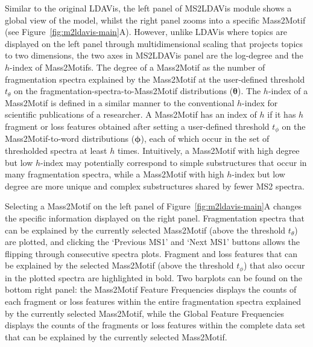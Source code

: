 Similar to the original LDAVis, the left panel of MS2LDAVis module shows a global view of the model, whilst the right panel zooms into a specific Mass2Motif (see Figure~\ref{fig:m2ldavis-main}A). However, unlike LDAVis where topics are displayed on the left panel through multidimensional scaling that projects topics to two dimensions, the two axes in MS2LDAVis panel are the log-degree and the $h$-index of Mass2Motifs. The degree of a Mass2Motif as the number of fragmentation spectra explained by the Mass2Motif at the user-defined threshold $t_{\theta}$ on the fragmentation-spectra-to-Mass2Motif distributions ($\boldsymbol{\theta}$). The $h$-index of a Mass2Motif is defined in a similar manner to the conventional $h$-index for scientific publications of a researcher. A Mass2Motif has an index of $h$ if it has $h$ fragment or loss features obtained after setting a user-defined threshold $t_{\phi}$ on the Mass2Motif-to-word distributions ($\boldsymbol{\phi}$), each of which occur in the set of thresholded spectra at least $h$ times. Intuitively, a Mass2Motif with high degree but low $h$-index may potentially correspond to simple substructures that occur in many fragmentation spectra, while a Mass2Motif with high $h$-index but low degree are more unique and complex substructures shared by fewer MS2 spectra.

Selecting a Mass2Motif on the left panel of Figure~\ref{fig:m2ldavis-main}A changes the specific information displayed on the right panel. Fragmentation spectra that can be explained by the currently selected Mass2Motif (above the threshold $t_{\theta}$) are plotted, and clicking the ‘Previous MS1’ and ‘Next MS1’ buttons allows the flipping through consecutive spectra plots. Fragment and loss features that can be explained by the selected Mass2Motif (above the threshold $t_{\phi}$) that also occur in the plotted spectra are highlighted in bold. Two barplots can be found on the bottom right panel: the Mass2Motif Feature Frequencies displays the counts of each fragment or loss features within the entire fragmentation spectra explained by the currently selected Mass2Motif, while the Global Feature Frequencies displays the counts of the fragments or loss features within the complete data set that can be explained by the currently selected Mass2Motif.

